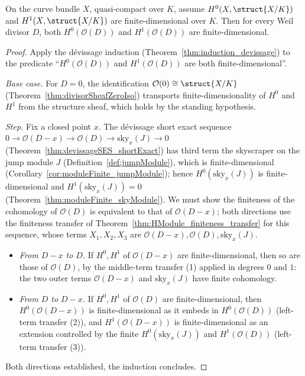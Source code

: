\begin{theorem}
  \label{thm:moduleFinite_divisorSheaf}
  \leanok
  On the curve bundle \(X\), quasi-compact over \(K\), assume \(H^0(X, \struct{X/K})\) and
  \(H^1(X, \struct{X/K})\) are finite-dimensional over \(K\). Then for every Weil divisor \(D\),
  both \(H^0(\mathcal O(D))\) and \(H^1(\mathcal O(D))\) are finite-dimensional.
\end{theorem}
\begin{proof}
  \leanok
  Apply the dévissage induction (Theorem~\ref{thm:induction_devissage}) to the predicate
  ``\(H^0(\mathcal O(D))\) and \(H^1(\mathcal O(D))\) are both finite-dimensional''.

  \emph{Base case.} For \(D = 0\), the identification \(\mathcal O(0) \cong \struct{X/K}\)
  (Theorem~\ref{thm:divisorSheafZeroIso}) transports finite-dimensionality of \(H^0\) and \(H^1\)
  from the structure sheaf, which holds by the standing hypothesis.

  \emph{Step.} Fix a closed point \(x\). The dévissage short exact sequence
  \(0 \to \mathcal O(D-x) \to \mathcal O(D) \to \mathrm{sky}_x(J) \to 0\)
  (Theorem~\ref{thm:devissageSES_shortExact}) has third term the skyscraper on the jump module
  \(J\) (Definition~\ref{def:jumpModule}), which is finite-dimensional
  (Corollary~\ref{cor:moduleFinite_jumpModule}); hence \(H^0(\mathrm{sky}_x(J))\) is
  finite-dimensional and \(H^1(\mathrm{sky}_x(J)) = 0\)
  (Theorem~\ref{thm:moduleFinite_skyModule}). We must show the finiteness of the cohomology of
  \(\mathcal O(D)\) is equivalent to that of \(\mathcal O(D-x)\); both directions use the
  finiteness transfer of Theorem~\ref{thm:HModule_finiteness_transfer} for this sequence, whose
  terms \(X_1, X_2, X_3\) are \(\mathcal O(D-x), \mathcal O(D), \mathrm{sky}_x(J)\).
  \begin{itemize}
    \item \emph{From \(D-x\) to \(D\).} If \(H^0, H^1\) of \(\mathcal O(D-x)\) are
      finite-dimensional, then so are those of \(\mathcal O(D)\), by the middle-term transfer
      (1) applied in degrees \(0\) and \(1\): the two outer terms \(\mathcal O(D-x)\) and
      \(\mathrm{sky}_x(J)\) have finite cohomology.
    \item \emph{From \(D\) to \(D-x\).} If \(H^0, H^1\) of \(\mathcal O(D)\) are
      finite-dimensional, then \(H^0(\mathcal O(D-x))\) is finite-dimensional as it embeds in
      \(H^0(\mathcal O(D))\) (left-term transfer (2)), and \(H^1(\mathcal O(D-x))\) is
      finite-dimensional as an extension controlled by the finite \(H^0(\mathrm{sky}_x(J))\) and
      \(H^1(\mathcal O(D))\) (left-term transfer (3)).
  \end{itemize}
  Both directions established, the induction concludes.
\end{proof}


